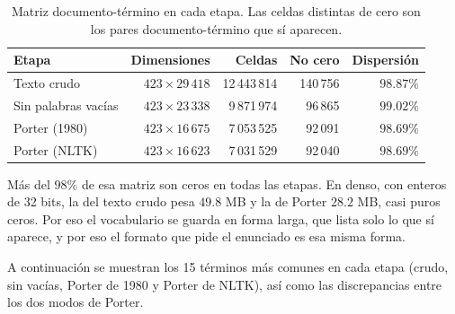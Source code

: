 \documentclass[11pt,letterpaper]{article}
\begin{document}
\begin{table}[H]
  \centering
  \begin{tabular}{lrrrr}
    \toprule
    \textbf{Etapa} & \textbf{Dimensiones} & \textbf{Celdas} &
      \textbf{No cero} & \textbf{Dispersión} \\
    \midrule
    Texto crudo         & $423 \times 29\,418$ & 12\,443\,814 &
      140\,756 & $98.87\%$ \\
    Sin palabras vacías & $423 \times 23\,338$ &  9\,871\,974 &
       96\,865 & $99.02\%$ \\
    Porter (1980)       & $423 \times 16\,675$ &  7\,053\,525 &
       92\,091 & $98.69\%$ \\
    Porter (NLTK)       & $423 \times 16\,623$ &  7\,031\,529 &
       92\,040 & $98.69\%$ \\
    \bottomrule
  \end{tabular}
  \caption{Matriz documento-término en cada etapa. Las celdas
    distintas de cero son los pares documento-término que sí
    aparecen.}
  \label{tab:matriz}
\end{table}

Más del $98\%$ de esa matriz son ceros en todas las etapas. En
denso, con enteros de 32 bits, la del texto crudo pesa $49.8$ MB y
la de Porter $28.2$ MB, casi puros ceros. Por eso el vocabulario se
guarda en forma larga, que lista solo lo que sí aparece, y por eso
el formato que pide el enunciado es esa misma forma.

A continuación se muestran los 15 términos más comunes en cada etapa
(crudo, sin vacías, Porter de 1980 y Porter de NLTK), así como las
discrepancias entre los dos modos de Porter.
\end{document}
